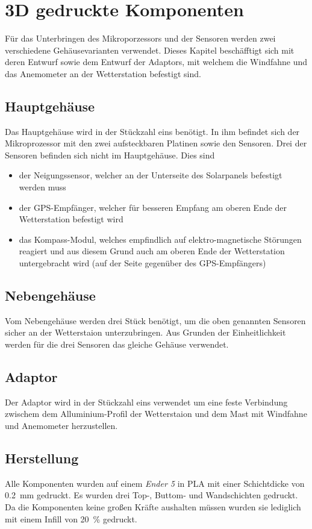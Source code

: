 \section{3D gedruckte Komponenten}\label{sec:gehaeuse}
Für das Unterbringen des Mikroporzessors und der Sensoren werden zwei verschiedene Gehäusevarianten verwendet. Dieses Kapitel beschäfftigt sich mit deren Entwurf sowie dem Entwurf der Adaptors, mit welchem die Windfahne und das Anemometer an der Wetterstation befestigt sind.

\subsection{Hauptgehäuse}\label{sec:ge_haupt}
Das Hauptgehäuse wird in der Stückzahl eins benötigt. In ihm befindet sich der Mikroprozessor mit den zwei aufsteckbaren Platinen sowie den Sensoren. Drei der Sensoren befinden sich nicht im Hauptgehäuse. Dies sind
\begin{itemize}
\item der Neigungssensor, welcher an der Unterseite des Solarpanels befestigt werden muss
\item der GPS-Empfänger, welcher für besseren Empfang am oberen Ende der Wetterstation befestigt wird
\item das Kompass-Modul, welches empfindlich auf elektro-magnetische Störungen reagiert und aus diesem Grund auch am oberen Ende der Wetterstation untergebracht wird (auf der Seite gegenüber des GPS-Empfängers)
\end{itemize}
\subsection{Nebengehäuse}\label{sec:ge_neben}
Vom Nebengehäuse werden drei Stück benötigt, um die oben genannten Sensoren sicher an der Wetterstaion unterzubringen. Aus Grunden der Einheitlichkeit werden für die drei Sensoren das gleiche Gehäuse verwendet.
\subsection{Adaptor}\label{sec:ge_adapt}
Der Adaptor wird in der Stückzahl eins verwendet um eine feste Verbindung zwischem dem Alluminium-Profil der Wetterstaion und dem Mast mit Windfahne und Anemometer herzustellen.
\subsection{Herstellung}\label{sec:ge_herst}
Alle Komponenten wurden auf einem \emph{Ender 5} in PLA mit einer Schichtdicke von \SI{0.2}{\milli\meter} gedruckt. Es wurden drei Top-, Buttom- und Wandschichten gedruckt. Da die Komponenten keine großen Kräfte aushalten müssen wurden sie lediglich mit einem Infill von \SI{20}{\percent} gedruckt.
